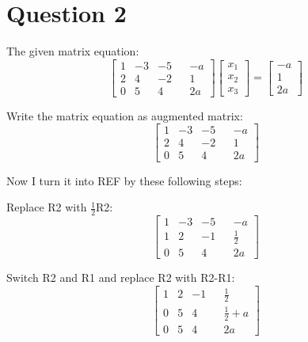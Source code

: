 \documentclass[10pt]{article}
\begin{document}
\section*{Question 2}
\noindent The given matrix equation:
\begin{equation*}
    \begin{bmatrix}
        1 & -3 & -5 && -a \\
        2 & 4 & -2 && 1 \\
        0 & 5 & 4 && 2a
    \end{bmatrix}
    \begin{bmatrix}
        x_1 \\
        x_2 \\
        x_3
    \end{bmatrix}
    =
    \begin{bmatrix}
        -a \\
        1 \\
        2a
    \end{bmatrix}
\end{equation*}


\noindent Write the matrix equation as augmented matrix:
\begin{equation*}
    \begin{bmatrix}
        1 & -3 & -5 && -a \\
        2 & 4 & -2 && 1 \\
        0 & 5 & 4 && 2a
    \end{bmatrix}
\end{equation*}

\noindent Now I turn it into REF by these following steps:
\par
\noindent Replace R2 with $\frac{1}{2}$R2:
\begin{equation*}
    \begin{bmatrix}
        1 & -3 & -5 && -a \\
        1 & 2 & -1 && \frac{1}{2} \\
        0 & 5 & 4 && 2a
    \end{bmatrix}
\end{equation*}

\noindent Switch R2 and R1 and replace R2 with R2-R1:
\begin{equation*}
    \begin{bmatrix}
        1 & 2 & -1 && \frac{1}{2} \\
        0 & 5 & 4 && \frac{1}{2} + a \\
        0 & 5 & 4 && 2a
    \end{bmatrix}
\end{equation*}
\end{document}
